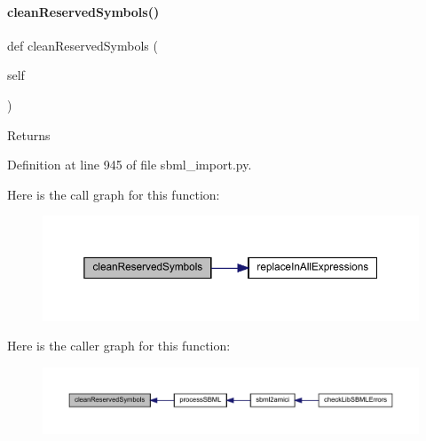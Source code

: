 \paragraph{\texorpdfstring{clean\+Reserved\+Symbols()}{cleanReservedSymbols()}}
{\footnotesize\ttfamily def clean\+Reserved\+Symbols (\begin{DoxyParamCaption}\item[{}]{self }\end{DoxyParamCaption})}

\begin{DoxyReturn}{Returns}

\end{DoxyReturn}


Definition at line 945 of file sbml\+\_\+import.\+py.

Here is the call graph for this function\+:
\nopagebreak
\begin{figure}[H]
\begin{center}
\leavevmode
\includegraphics[width=350pt]{classamici_1_1sbml__import_1_1_sbml_importer_a122b9921e2fb5bd0fc75310c47413dd1_cgraph}
\end{center}
\end{figure}
Here is the caller graph for this function\+:
\nopagebreak
\begin{figure}[H]
\begin{center}
\leavevmode
\includegraphics[width=350pt]{classamici_1_1sbml__import_1_1_sbml_importer_a122b9921e2fb5bd0fc75310c47413dd1_icgraph}
\end{center}
\end{figure}
\mbox{\label{classamici_1_1sbml__import_1_1_sbml_importer_a5348e7b5041334f8c54b45c5c928dea0}} 
